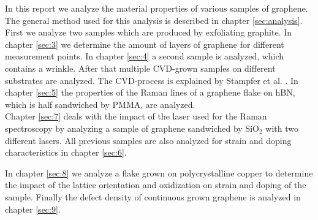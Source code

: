 \documentclass[12pt,a4paper]{article}
\begin{document}
In this report we analyze the material properties of various samples of graphene. The general method used for this analysis is described in chapter \ref{sec:analysis}. First we analyze two samples which are produced by exfoliating graphite. In chapter \ref{sec:3} we determine the amount of layers of graphene for different measurement points. In chapter \ref{sec:4} a second sample is analyzed, which contains a wrinkle.
After that multiple CVD-grown samples on different substrates are analyzed. The CVD-process is explained by Stampfer et al. \cite{Banszeruse}. In chapter \ref{sec:5} the properties of the Raman lines of a graphene flake on hBN, which is half sandwiched by PMMA, are analyzed.\\
Chapter \ref{sec:7} deals with the impact of the laser used for the Raman spectroscopy by analyzing a sample of graphene sandwiched by SiO$_2$ with two different lasers.
All previous samples are also analyzed for strain and doping characteristics in chapter \ref{sec:6}.

In chapter \ref{sec:8} we analyze a flake grown on polycrystalline copper to determine the impact of the lattice orientation and oxidization on strain and doping of the sample. Finally the defect density of continuous grown graphene is analyzed in chapter \ref{sec:9}.
\end{document}

